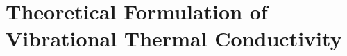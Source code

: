 \documentclass[aps,prb,onecolumn,preprint,superscriptaddress,footinbib,amsmath,amssymb,floatfix]{revtex4}
\begin{document}


\section{\label{S:Theory:Thermal}Theoretical Formulation of 
Vibrational Thermal Conductivity}
\end{document}
